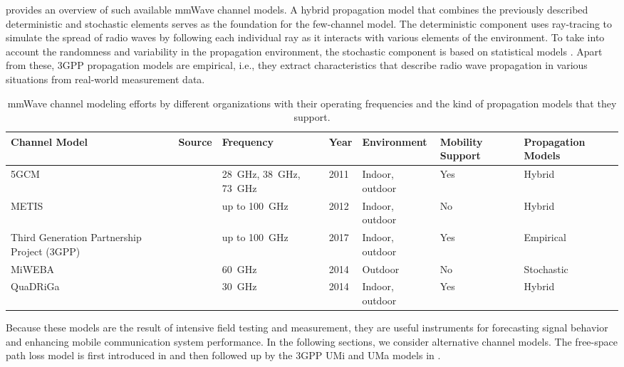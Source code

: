  provides an overview of such available mmWave channel models. A hybrid propagation model that combines the previously described deterministic and stochastic elements serves as the foundation for the few-channel model. The deterministic component uses ray-tracing to simulate the spread of radio waves by following each individual ray as it interacts with various elements of the environment. To take into account the randomness and variability in the propagation environment, the stochastic component is based on statistical models \cite{8207426}. Apart from these, 3GPP propagation models are empirical, i.e., they extract characteristics that describe radio wave propagation in various situations from real-world measurement data.
\begin{table}[tb] %
	\footnotesize
	\caption{\ac{mmWave} channel modeling efforts by different organizations with their operating frequencies and the kind of propagation models that they support.}
	\label{Mmwave Channel modeling efforts by different organizations}
	\centering
	\begin{tabular}{C{3.25cm}|C{1.3cm}|C{1.8cm}|C{0.7cm}|C{2.3cm}|C{1.7cm}|C{1.9cm}}
		\textbf{Channel Model} & \bf Source & \bf Frequency & \bf Year & \bf Environment & \bf Mobility Support & \bf Propagation Models \\
		\hline 
		\ac{5GCM} & \cite{5GCM, KabulUni} & \SI{28}{\giga\hertz}, \SI{38}{\giga\hertz}, \SI{73}{\giga\hertz} & \num{2011} & Indoor, outdoor & Yes & Hybrid\\
		\hline 
		\ac{METIS} &  \cite{METIS, KabulUni} & up to \SI{100}{\giga\hertz} &  \num{2012} & Indoor, outdoor & No & Hybrid \\
		\hline 
		Third Generation Partnership Project (\ac{3GPP}) & \cite{3GPP17, KabulUni} & up to \SI{100}{\giga\hertz} &  \num{2017} & Indoor, outdoor & Yes & Empirical\\
		\hline 
		\ac{MiWEBA} & \cite{miwebaquadriga, weiler2016quasi} & \SI{60}{\giga\hertz} &  \num{2014} & Outdoor & No & Stochastic \\
		\hline 
		\ac{QuaDRiGa} & \cite{miwebaquadriga} & \SI{30}{\giga\hertz} & \num{2014} & Indoor, outdoor & Yes & Hybrid \\
	\end{tabular}
\end{table}
Because these models are the result of intensive field testing and measurement, they are useful instruments for forecasting signal behavior and enhancing mobile communication system performance. In the following sections, we consider alternative channel models. The free-space path loss model is first introduced in  and then followed up by the 3GPP UMi and UMa models in .
